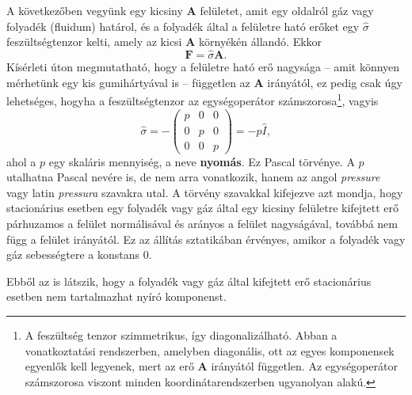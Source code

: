 \documentclass[12pt,a4paper]{scrartcl}
\let\mathbf\bm
\begin{document}
A következőben vegyünk egy kicsiny ${\mathbf{A}}$ felületet, amit egy oldalról gáz vagy folyadék (fluidum) határol, és a folyadék által a felületre ható erőket egy $\hat \sigma$ feszültségtenzor kelti, amely az kicsi ${\mathbf{A}}$ környékén állandó. Ekkor 
\[{\mathbf{F}} = \hat \sigma {\mathbf{A}}.\]
Kísérleti úton megmutatható, hogy a felületre ható erő nagysága -- amit könnyen mérhetünk egy kis gumihártyával is -- független az ${\mathbf{A}}$ irányától, ez pedig csak úgy lehetséges, hogyha a feszültségtenzor az egységoperátor számszorosa\footnote{A feszültség tenzor szimmetrikus, így diagonalizálható. Abban a vonatkoztatási rendszerben, amelyben diagonális, ott az egyes komponensek egyenlők kell legyenek, mert az erő ${\mathbf{A}}$ irányától független. Az egységoperátor számszorosa viszont minden koordinátarendszerben ugyanolyan alakú.}, vagyis
\begin{equation} \label{eq:pascal}
\hat \sigma  =  - \left( {\begin{array}{*{20}{c}}
  p&0&0 \\ 
  0&p&0 \\ 
  0&0&p 
\end{array}} \right) =  - p\hat I,
\end{equation}
ahol a $p$ egy skaláris mennyiség, a neve \textbf{nyomás}. Ez Pascal törvénye. A $p$ utalhatna Pascal nevére is, de nem arra vonatkozik, hanem az angol \textit{pressure} vagy latin \textit{pressura} szavakra utal. A törvény szavakkal kifejezve azt mondja, hogy stacionárius esetben egy folyadék vagy gáz által egy kicsiny felületre kifejtett erő párhuzamos a felület normálisával és arányos a felület nagyságával, továbbá nem függ a felület irányától. Ez az állítás sztatikában érvényes, amikor a folyadék vagy gáz sebességtere a konstans 0.

Ebből az is látszik, hogy a folyadék vagy gáz által kifejtett erő stacionárius esetben nem tartalmazhat nyíró komponenst.

\footnotesize
\end{document}
